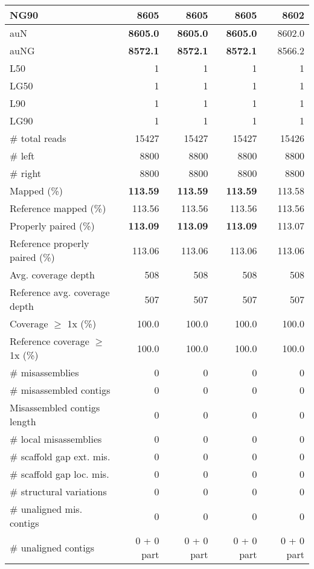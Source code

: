 \documentclass[12pt,a4paper]{article}
\begin{document}
\begin{table}[ht]
\begin{center}
\begin{tabular}{|l*{4}{|r}|}
NG90 & {\bf 8605} & {\bf 8605} & {\bf 8605} & 8602 \\ \hline
auN & {\bf 8605.0} & {\bf 8605.0} & {\bf 8605.0} & 8602.0 \\ \hline
auNG & {\bf 8572.1} & {\bf 8572.1} & {\bf 8572.1} & 8566.2 \\ \hline
L50 & 1 & 1 & 1 & 1 \\ \hline
LG50 & 1 & 1 & 1 & 1 \\ \hline
L90 & 1 & 1 & 1 & 1 \\ \hline
LG90 & 1 & 1 & 1 & 1 \\ \hline
\# total reads & 15427 & 15427 & 15427 & 15426 \\ \hline
\# left & 8800 & 8800 & 8800 & 8800 \\ \hline
\# right & 8800 & 8800 & 8800 & 8800 \\ \hline
Mapped (\%) & {\bf 113.59} & {\bf 113.59} & {\bf 113.59} & 113.58 \\ \hline
Reference mapped (\%) & 113.56 & 113.56 & 113.56 & 113.56 \\ \hline
Properly paired (\%) & {\bf 113.09} & {\bf 113.09} & {\bf 113.09} & 113.07 \\ \hline
Reference properly paired (\%) & 113.06 & 113.06 & 113.06 & 113.06 \\ \hline
Avg. coverage depth & 508 & 508 & 508 & 508 \\ \hline
Reference avg. coverage depth & 507 & 507 & 507 & 507 \\ \hline
Coverage $\geq$ 1x (\%) & 100.0 & 100.0 & 100.0 & 100.0 \\ \hline
Reference coverage $\geq$ 1x (\%) & 100.0 & 100.0 & 100.0 & 100.0 \\ \hline
\# misassemblies & 0 & 0 & 0 & 0 \\ \hline
\# misassembled contigs & 0 & 0 & 0 & 0 \\ \hline
Misassembled contigs length & 0 & 0 & 0 & 0 \\ \hline
\# local misassemblies & 0 & 0 & 0 & 0 \\ \hline
\# scaffold gap ext. mis. & 0 & 0 & 0 & 0 \\ \hline
\# scaffold gap loc. mis. & 0 & 0 & 0 & 0 \\ \hline
\# structural variations & 0 & 0 & 0 & 0 \\ \hline
\# unaligned mis. contigs & 0 & 0 & 0 & 0 \\ \hline
\# unaligned contigs & 0 + 0 part & 0 + 0 part & 0 + 0 part & 0 + 0 part \\ \hline

\end{tabular}
\end{center}
\end{table}
\end{document}
